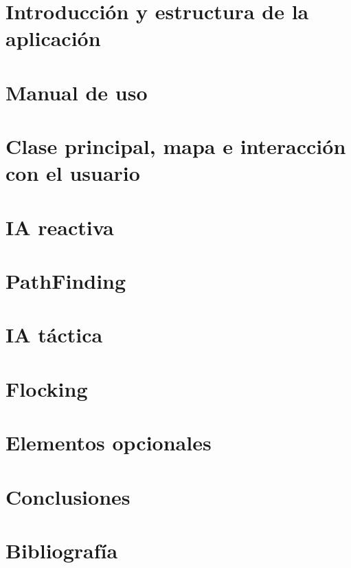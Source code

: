 \documentclass[a4paper,10pt]{article}
\begin{document}
\newpage
\part{Introducción y estructura de la aplicación}





\newpage
\part{Manual de uso}



\newpage
\part{Clase principal, mapa e interacción con el usuario}







\newpage
\part{IA reactiva}









\newpage
\part{PathFinding}



\newpage
\part{IA táctica}

















\newpage
\part{Flocking}




\newpage
\part{Elementos opcionales}




\newpage
\part{Conclusiones}



\newpage
\part{Bibliografía}

\end{document}

